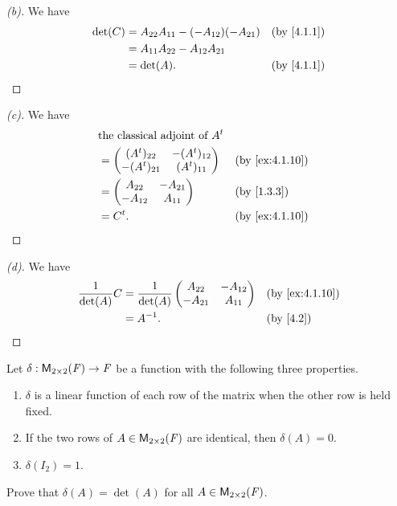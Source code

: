 \begin{proof}[(b)]
	We have
	\begin{align*}
		\det(C) & = A_{2 2} A_{1 1} - (-A_{1 2}) (-A_{2 1}) &  & \by{4.1.1} \\
		        & = A_{1 1} A_{2 2} - A_{1 2} A_{2 1}                       \\
		        & = \det(A).                                &  & \by{4.1.1}
	\end{align*}
\end{proof}

\begin{proof}[(c)]
	We have
	\begin{align*}
		 & \text{the classical adjoint of } \tp{A}                     \\
		 & = \begin{pmatrix}
			     (\tp{A})_{2 2}  & -(\tp{A})_{1 2} \\
			     -(\tp{A})_{2 1} & (\tp{A})_{1 1}
		     \end{pmatrix}    &  & \by{ex:4.1.10}                      \\
		 & = \begin{pmatrix}
			     A_{2 2}  & -A_{2 1} \\
			     -A_{1 2} & A_{1 1}
		     \end{pmatrix}                  &  & \by{1.3.3}            \\
		 & = \tp{C}.                               &  & \by{ex:4.1.10}
	\end{align*}
\end{proof}

\begin{proof}[(d)]
	We have
	\begin{align*}
		\frac{1}{\det(A)} C & = \frac{1}{\det(A)} \begin{pmatrix}
			                                          A_{2 2}  & -A_{1 2} \\
			                                          -A_{2 1} & A_{1 1}
		                                          \end{pmatrix} &  & \by{ex:4.1.10} \\
		                    & = A^{-1}.                           &  & \by{4.2}
	\end{align*}
\end{proof}

\begin{ex}\label{ex:4.1.11}
	Let \(\delta : \mathsf{M}_{{2} \times 2}({\mathit{F}}) \to \mathit{F}\) be a function with the following three properties.
	\begin{enumerate}
		\item \(\delta\) is a linear function of each row of the matrix when the other row is held fixed.
		\item If the two rows of \(A \in \mathsf{M}_{{2} \times 2}({\mathit{F}})\) are identical, then \(\delta(A) = 0\).
		\item \(\delta(I_2) = 1\).
	\end{enumerate}
	Prove that \(\delta(A) = \det(A)\) for all \(A \in \mathsf{M}_{{2} \times 2}({\mathit{F}})\).
\end{ex}

